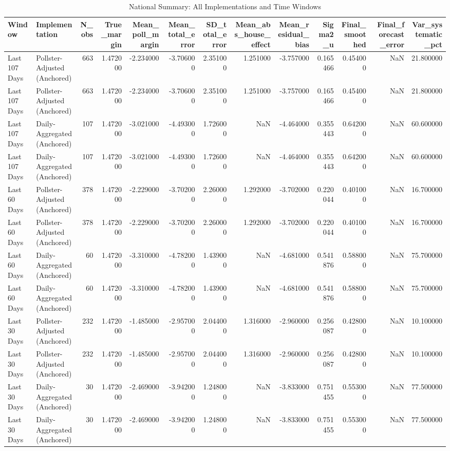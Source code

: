 \begin{table}
\caption{National Summary: All Implementations and Time Windows}
\label{tab:national_summary}
\begin{tabular}{llrrrrrrrrrrr}
\toprule
Window & Implementation & N_obs & True_margin & Mean_poll_margin & Mean_total_error & SD_total_error & Mean_abs_house_effect & Mean_residual_bias & Sigma2_u & Final_smoothed & Final_forecast_error & Var_systematic_pct \\
\midrule
Last 107 Days & Pollster-Adjusted (Anchored) & 663 & 1.472000 & -2.234000 & -3.706000 & 2.351000 & 1.251000 & -3.757000 & 0.165466 & 0.454000 & NaN & 21.800000 \\
Last 107 Days & Pollster-Adjusted (Anchored) & 663 & 1.472000 & -2.234000 & -3.706000 & 2.351000 & 1.251000 & -3.757000 & 0.165466 & 0.454000 & NaN & 21.800000 \\
Last 107 Days & Daily-Aggregated (Anchored) & 107 & 1.472000 & -3.021000 & -4.493000 & 1.726000 & NaN & -4.464000 & 0.355443 & 0.642000 & NaN & 60.600000 \\
Last 107 Days & Daily-Aggregated (Anchored) & 107 & 1.472000 & -3.021000 & -4.493000 & 1.726000 & NaN & -4.464000 & 0.355443 & 0.642000 & NaN & 60.600000 \\
Last 60 Days & Pollster-Adjusted (Anchored) & 378 & 1.472000 & -2.229000 & -3.702000 & 2.260000 & 1.292000 & -3.702000 & 0.220044 & 0.401000 & NaN & 16.700000 \\
Last 60 Days & Pollster-Adjusted (Anchored) & 378 & 1.472000 & -2.229000 & -3.702000 & 2.260000 & 1.292000 & -3.702000 & 0.220044 & 0.401000 & NaN & 16.700000 \\
Last 60 Days & Daily-Aggregated (Anchored) & 60 & 1.472000 & -3.310000 & -4.782000 & 1.439000 & NaN & -4.681000 & 0.541876 & 0.588000 & NaN & 75.700000 \\
Last 60 Days & Daily-Aggregated (Anchored) & 60 & 1.472000 & -3.310000 & -4.782000 & 1.439000 & NaN & -4.681000 & 0.541876 & 0.588000 & NaN & 75.700000 \\
Last 30 Days & Pollster-Adjusted (Anchored) & 232 & 1.472000 & -1.485000 & -2.957000 & 2.044000 & 1.316000 & -2.960000 & 0.256087 & 0.428000 & NaN & 10.100000 \\
Last 30 Days & Pollster-Adjusted (Anchored) & 232 & 1.472000 & -1.485000 & -2.957000 & 2.044000 & 1.316000 & -2.960000 & 0.256087 & 0.428000 & NaN & 10.100000 \\
Last 30 Days & Daily-Aggregated (Anchored) & 30 & 1.472000 & -2.469000 & -3.942000 & 1.248000 & NaN & -3.833000 & 0.751455 & 0.553000 & NaN & 77.500000 \\
Last 30 Days & Daily-Aggregated (Anchored) & 30 & 1.472000 & -2.469000 & -3.942000 & 1.248000 & NaN & -3.833000 & 0.751455 & 0.553000 & NaN & 77.500000 \\
\bottomrule
\end{tabular}
\end{table}
